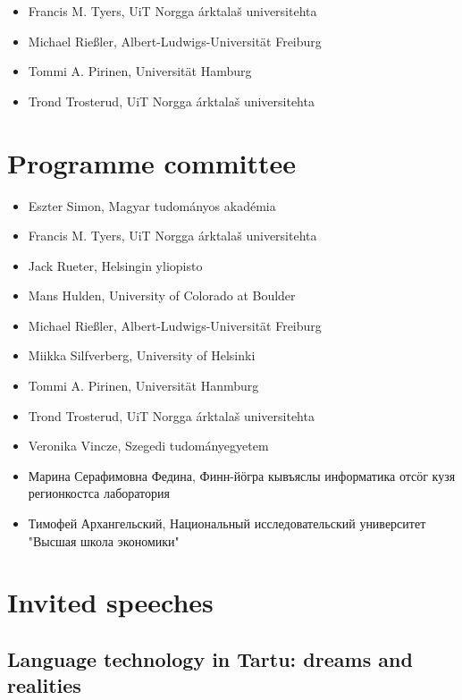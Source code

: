 \documentclass[b5paper]{book}
\newcommand\thedoi{doidoi}
\begin{document}
\begin{itemize}
    \item Francis M. Tyers, UiT Norgga árktalaš universitehta
    \item Michael Rießler, Albert-Ludwigs-Universität Freiburg
    \item Tommi A. Pirinen, Universität Hamburg
    \item Trond Trosterud, UiT Norgga árktalaš universitehta
\end{itemize}

\renewcommand\thedoi{doidoi}

\chapter*{Programme committee}

\begin{itemize}
    \item Eszter Simon, Magyar tudományos akadémia
    \item Francis M. Tyers, UiT Norgga árktalaš universitehta
    \item Jack Rueter, Helsingin yliopisto
    \item Mans Hulden, University of Colorado at Boulder
    \item Michael Rießler, Albert-Ludwigs-Universität Freiburg
    \item Miikka Silfverberg, University of Helsinki
    \item Tommi A. Pirinen, Universität Hanmburg
    \item Trond Trosterud, UiT Norgga árktalaš universitehta
    \item Veronika Vincze, Szegedi tudományegyetem
    \item Марина Серафимовна Федина, Финн-йӧгра кывъяслы информатика отсӧг кузя регионкостса лаборатория
    \item Тимофей Архангельский, Национальный исследовательский университет "Высшая школа экономики"
\end{itemize}

\tableofcontents

\mainmatter

\chapter{Invited speeches}
\section{Language technology in Tartu: dreams and realities}
\end{document}
